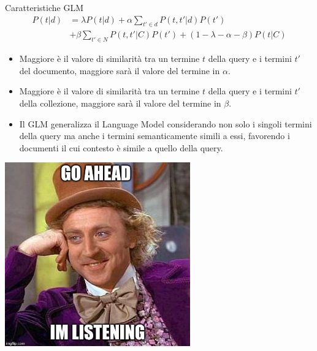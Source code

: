 \begin{frame}{Caratteristiche GLM}
    \setlength{\abovedisplayskip}{-12pt}
    \setlength{\belowdisplayskip}{-2pt}
    \[
        \begin{split}
            P(t|d) & = \lambda P(t|d) + \alpha \sum_{{t}'\in d}P(t,{t}'|d)P({t}')\\
            & + \beta \sum_{{t}'\in N}P(t,{t}'|C)P({t}') + (1-\lambda-\alpha-\beta)P(t|C)
        \end{split}
    \]
    \begin{itemize}
        \item Maggiore è il valore di similarità tra un termine \(t\) della query e i termini \({t}'\) del documento, maggiore sarà il valore del termine in \(\alpha\).
        \item Maggiore è il valore di similarità tra un termine \(t\) della query e i termini \({t}'\) della collezione, maggiore sarà il valore del termine in \(\beta\).
        \item Il GLM generalizza il Language Model considerando non solo i singoli termini della query ma anche i termini semanticamente simili a essi, favorendo i documenti il cui contesto è simile a quello della query.
    \end{itemize}
\end{frame}

\begin{frame}{\phantom{meme}}
    \begin{center}
        \includegraphics[width=0.6\textwidth]{img/meme.jpg}
    \end{center}
\end{frame}